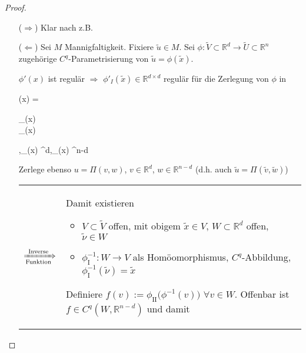 \begin{proof}\hspace*{0pt}
	\vspace*{\dimexpr-\baselineskip+1mm\relax}
	\begin{itemize}
		\item[($\Rightarrow$)] Klar nach z.B. 
		\item[($\Leftarrow$)] Sei $M$ Mannigfaltigkeit. Fixiere $\tilde{u}\in M$. Sei $\phi\!:\tilde{V}\subset \mathbb{R}^d \to \tilde{U}\subset \mathbb{R}^n$ zugehörige $C^q$-Parametrisierung von $\tilde{u} = \phi(\tilde{x})$.
		
		$\phi'(x)$ ist regulär $\Rightarrow$ $\phi'_I (\tilde{x}) \in \mathbb{R}^{d\times d}$ regulär für die Zerlegung von $\phi$ in\begin{flalign*}
			\phi(x) = \Pi \begin{pmatrix} \phi_{}(x) \\ \phi_{}(x)\end{pmatrix},\quad \phi_{}(x) \in {}^d,\quad \phi_{}(x) \in {}^{n-d}
		\end{flalign*}
		
		Zerlege ebenso $u = \Pi(v,w)$, $v\in \mathbb{R}^{d}$, $w\in \mathbb{R}^{n-d}$ (d.h. auch $\tilde{u} = \Pi(\tilde{v}, \tilde{w})$)\par
		\begin{tabularx}{\linewidth}{r@{\ }X}
			$\xRightarrow[\text{Funktion}]{\text{Inverse}}$ &
			Damit existieren\par
			\begin{minipage}[t]{\linewidth}
				\begin{itemize}
					\item $V\subset \tilde{V}$ offen, mit obigem $\tilde{x} \in V$, $W\subset \mathbb{R}^d$ offen, $\tilde{\nu}\in W$
					\item $\phi^{-1}_{\text{I}}\!\!: W\to V$ als Homöomorphismus, $C^q$-Abbildung, $\phi_{\text{I}}^{-1}(\tilde{\nu}) = \tilde{x}$
				\end{itemize}
			\end{minipage}
			\vspace*{1mm}
			
			Definiere $f(v) := \phi_{\text{II}}\big(\phi^{-1}(v)\big)$ $\forall v\in W$. Offenbar ist $f\in C^q(W, \mathbb{R}^{n-d})$ und damit
			

\end{tabularx}
\end{itemize}
\end{proof}
